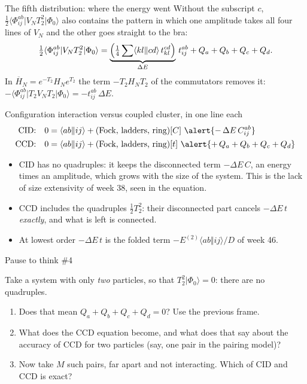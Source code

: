 \documentclass[aspectratio=169,10pt]{beamer}
\newcounter{thinkctr}
\newcommand{\thinkq}[2]{%
  \stepcounter{thinkctr}%
  \vfill
  \begin{tcolorbox}[enhanced,colback=palewarm,colframe=warm,boxrule=1.2pt,arc=4pt,
    grow to left by=6mm,grow to right by=6mm,
    left=16pt,right=16pt,top=16pt,bottom=18pt,
    fonttitle=\bfseries\Large,fontupper=\Large,
    title={Pause to think \#\thethinkctr\hfill\mdseries\normalsize(about #1 min -- discuss with your neighbour)}]
  #2
  \end{tcolorbox}
  \vfill}
\newcommand{\ket}[1]{\vert #1\rangle}
\newcommand{\mel}[3]{\langle #1\lvert #2\rvert #3\rangle}
\newcommand{\ph}{\Phi_0}
\newcommand{\Hbar}{\overline{H}}
\newcommand{\as}[4]{\langle #1#2\Vert #3#4\rangle}
\begin{document}
\begin{frame}[shrink=13]{The fifth distribution: where the energy went}
\small
Without the subscript $c$, $\tfrac12\mel{\Phi_{ij}^{ab}}{V_NT_2^2}{\ph}$ also contains the pattern in which one amplitude takes all four lines of $V_N$ and the other goes straight to the bra:
\[
 \tfrac12\mel{\Phi_{ij}^{ab}}{V_NT_2^2}{\ph}
 =\underbrace{\Bigl(\tfrac14\sum\as klcd\,t_{kl}^{cd}\Bigr)}_{\Delta E}\,t_{ij}^{ab}+Q_a+Q_b+Q_c+Q_d .
\]
In $\Hbar_N=e^{-T_2}H_Ne^{T_2}$ the term $-T_2H_NT_2$ of the commutators removes it: $-\mel{\Phi_{ij}^{ab}}{T_2V_NT_2}{\ph}=-t_{ij}^{ab}\,\Delta E$.
\begin{block}{Configuration interaction versus coupled cluster, in one line each}
\begin{align*}
\text{CID:}\quad 0&=\as abij+(\text{Fock, ladders, ring})[C]\ \alert{-\,\Delta E\,C_{ij}^{ab}}\\
\text{CCD:}\quad 0&=\as abij+(\text{Fock, ladders, ring})[t]\ \alert{+\,Q_a+Q_b+Q_c+Q_d}
\end{align*}
\end{block}
\begin{itemize}
\item CID has no quadruples: it keeps the disconnected term $-\Delta E\,C$, an energy times an amplitude, which grows with the size of the system. This is the lack of size extensivity of week 38, seen in the equation.
\item CCD includes the quadruples $\tfrac12T_2^2$: their disconnected part cancels $-\Delta E\,t$ \emph{exactly}, and what is left is connected.
\item At lowest order $-\Delta E\,t$ is the folded term $-E^{(2)}\as abij/D$ of week 46.
\end{itemize}
\end{frame}

\begin{frame}{Pause to think \#4}
\thinkq{4}{Take a system with only \emph{two} particles, so that $T_2^2\ket{\ph}=0$: there are no quadruples.
\begin{enumerate}
\item Does that mean $Q_a+Q_b+Q_c+Q_d=0$? Use the previous frame.
\item What does the CCD equation become, and what does that say about the accuracy of CCD for two particles (say, one pair in the pairing model)?
\item Now take $M$ such pairs, far apart and not interacting. Which of CID and CCD is exact?
\end{enumerate}}
\end{frame}
\end{document}
